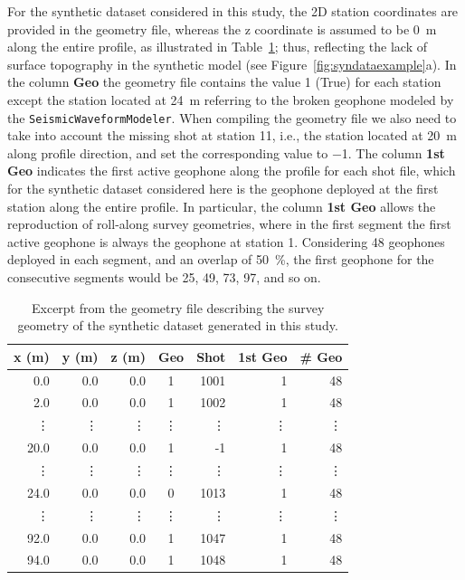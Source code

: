 \documentclass[a4paper,fleqn]{cas-sc}
\begin{document}
For the synthetic dataset considered in this study, the 2D station coordinates are provided in the geometry file, whereas the z coordinate is assumed to be \qty{0}{m} along the entire profile, as illustrated in Table~\ref{tab:syn_geometry}; thus, reflecting the lack of surface topography in the synthetic model (see Figure~\ref{fig:syndataexample}a). In the column \textbf{Geo} the geometry file contains the value 1 (True) for each station except the station located at \qty{24}{m} referring to the broken geophone modeled by the \texttt{SeismicWaveformModeler}. When compiling the geometry file we also need to take into account the missing shot at station 11, i.e., the station located at \qty{20}{m} along profile direction, and set the corresponding value to \num{-1}. 
The column \textbf{1st Geo} indicates the first active geophone along the profile for each shot file, which for the synthetic dataset considered here is the geophone deployed at the first station along the entire profile. In particular, the column \textbf{1st Geo} allows the reproduction of roll-along survey geometries, where in the first segment the first active geophone is always the geophone at station 1. Considering 48 geophones deployed in each segment, and an overlap of \qty{50}{\%}, the first geophone for the consecutive segments would be 25, 49, 73, 97, and so on. 
\begin{table}
   \caption{Excerpt from the geometry file describing the survey geometry of the synthetic dataset generated in this study.}
    \centering
    \begin{tabular}{rrrcrrr}
        \toprule
        \textbf{x (m)} & \textbf{y (m)} & \textbf{z (m)} & \textbf{Geo} & \textbf{Shot} & \textbf{1st Geo} & \textbf{\# Geo} \\
        \midrule
		0.0 & 0.0 & 0.0 & 1 & 1001 & 1 & 48 \\
		2.0 & 0.0 & 0.0 & 1 & 1002 & 1 & 48 \\
        \vdots & \vdots & \vdots & \vdots & \vdots & \vdots & \vdots \\
		20.0 & 0.0 & 0.0 & 1 & -1 & 1 & 48 \\
        \vdots & \vdots & \vdots & \vdots & \vdots & \vdots & \vdots \\
        24.0 & 0.0 & 0.0 & 0 & 1013 & 1 & 48 \\
        \vdots & \vdots & \vdots & \vdots & \vdots & \vdots & \vdots \\
		92.0 & 0.0 & 0.0 & 1 & 1047 & 1 & 48 \\
		94.0 & 0.0 & 0.0 & 1 & 1048 & 1 & 48 \\
        \bottomrule
    \end{tabular}
    \label{tab:syn_geometry}
\end{table}
\end{document}
